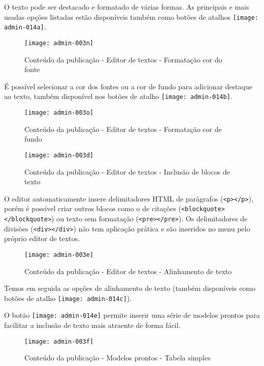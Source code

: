 O texto pode ser destacado e formatado de várias formas. As principais e mais usadas opções listadas estão disponíveis também como botões de atalhos {\texttt{[image: admin-014a]}}.

\begin{figure}[!ht]
    \centering
    \texttt{[image: admin-003n]}
    \caption{Conteúdo da publicação - Editor de textos - Formatação cor do fonte}\label{RS0006:fig:admin-003n}
\end{figure}

É possível selecionar a cor dos fontes ou a cor de fundo para adicionar destaque ao texto, também disponível nos botões de atalho {\texttt{[image: admin-014b]}}.

\begin{figure}[!ht]
    \centering
    \texttt{[image: admin-003o]}
    \caption{Conteúdo da publicação - Editor de textos - Formatação cor de fundo}\label{RS0006:fig:admin-003o}
\end{figure}

\begin{figure}[!ht]
    \centering
    \texttt{[image: admin-003d]}
    \caption{Conteúdo da publicação - Editor de textos - Inclusão de blocos de texto}\label{RS0006:fig:admin-003d}
\end{figure}

O editor automaticamente insere delimitadores \gls{HTML} de parágrafos (\texttt{<p></p>}), porém é possível criar outros blocos como o de citações (\texttt{<blockquote></blockquote>}) ou texto sem formatação (\texttt{<pre></pre>}). Os delimitadores de divisões (\texttt{<div></div>}) não tem aplicação prática e são inseridos no menu pelo próprio editor de textos.

\begin{figure}[!ht]
    \centering
    \texttt{[image: admin-003e]}
    \caption{Conteúdo da publicação - Editor de textos - Alinhamento de texto}\label{RS0006:fig:admin-003e}
\end{figure}

Temos em seguida as opções de alinhamento de texto (também disponíveis como botões de atalho {\texttt{[image: admin-014c]}}).

O botão {\texttt{[image: admin-014e]}} permite inserir uma série de modelos prontos para facilitar a inclusão de texto mais atraente de forma fácil.

\begin{figure}[!ht]
    \centering
    \texttt{[image: admin-003f]}
    \caption{Conteúdo da publicação - Modelos prontos - Tabela simples}\label{RS0006:fig:admin-003f}
\end{figure}

